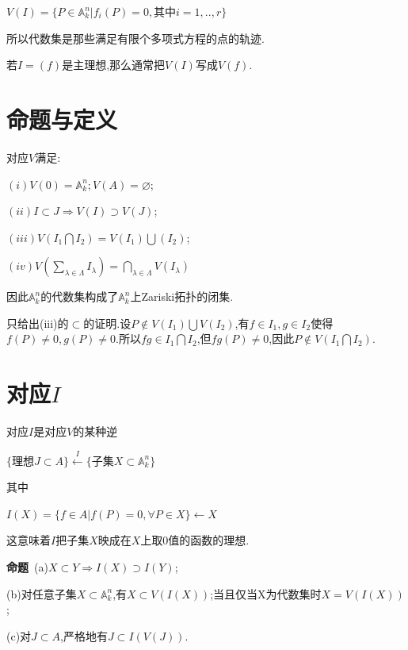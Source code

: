 \documentclass[UTF8]{book}
\begin{document}
		
		\begin{center}
			$V(I)=\{P \in \mathbb{A}^{n}_{k}|f_{i}(P)=0,\text{其中}i=1,..,r\}$
		\end{center}
		
		
		所以代数集是那些满足有限个多项式方程的点的轨迹.
		
		
		若$ I=(f) $是主理想,那么通常把$ V(I) $写成$ V(f) $.
		
		
	\section{命题与定义}
		对应$ V $满足:
		
		
		$(i)V (0)=\mathbb{A}^{n}_{k}; V(A)=\varnothing$;
		
		
		$(ii)I \subset J \Rightarrow V(I)\supset V(J)$;
		
		
		$(iii)V(I_{1} \bigcap I_{2}) = V(I_{1}) \bigcup (I_{2})$;
		
		
		$(iv)V(\sum _{\lambda \in \Lambda}I_{\lambda})=\bigcap _{\lambda \in \Lambda}V(I_{\lambda})$
		
		
		因此$\mathbb{A}^{n}_{k}$的代数集构成了$\mathbb{A}^{n}_{k}$上Zariski拓扑的闭集.
		
		
		只给出(iii)的$\subset$的证明.设$P\notin V(I_{1}) \bigcup V(I_{2})$,有$f\in I_{1},g\in I_{2}$使得$f(P) \ne 0,g(P) \ne 0$.所以$fg\in I_{1} \bigcap I_{2}$,但$fg(P) \ne 0$,因此$P\notin V(I_{1} \bigcap I_{2})$.
		
		
	\section{对应$ I $}
		对应$ I $是对应$ V $的某种逆
		
		
		\begin{center}
			$\{\text{理想}J\subset A\}\stackrel{I}{\longleftarrow} \{\text{子集}X \subset \mathbb{A}^{n}_{k}\}$
		\end{center}
		其中
			\begin{center}
			$I(X)=\{f \in A|f(P)=0,\forall P\in X\} \gets X$
		\end{center}
		
		
		这意味着$ I $把子集$ X $映成在$ X $上取0值的函数的理想.
		
		
		\textbf{命题}\ (a)$X\subset Y \Rightarrow I(X) \supset I(Y)$;
		
		
		(b)对任意子集$X \subset \mathbb{A}^{n}_{k}$,有$X \subset V(I(X))$;当且仅当X为代数集时$X = V(I(X))$;
		
		
		(c)对$J \subset A$,严格地有$J \subset I(V(J))$.
		
\end{document}
